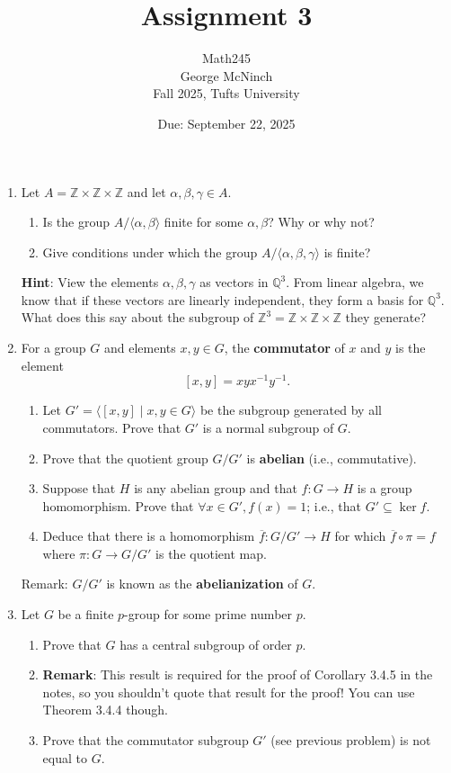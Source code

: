 \documentclass{article}
\title{Assignment 3}
\author{Math245 \\ George McNinch \\ Fall 2025, Tufts University}
\date{Due: September 22, 2025}
\begin{document}
\maketitle

\begin{enumerate}
\item Let $ A = \mathbb{Z} \times \mathbb{Z} \times \mathbb{Z} $ and let $ \alpha, \beta, \gamma \in A $.
  \begin{enumerate}
  \item Is the group $ A / \langle \alpha, \beta \rangle $ finite for some $ \alpha, \beta $? Why or why not?
  \item Give conditions under which the group $ A / \langle \alpha, \beta, \gamma \rangle $ is finite?
  \end{enumerate}
  \textbf{Hint}: View the elements $ \alpha, \beta, \gamma $ as vectors in $ \mathbb{Q}^3 $. From linear algebra, we know that if these vectors are linearly independent, they form a basis for $ \mathbb{Q}^3 $. What does this say about the subgroup of $ \mathbb{Z}^3 = \mathbb{Z} \times \mathbb{Z} \times \mathbb{Z} $ they generate?

\item For a group $ G $ and elements $ x, y \in G $, the \textbf{commutator} of $ x $ and $ y $ is the element
  $$[x,y] = x y x^{-1} y^{-1}.$$
  \begin{enumerate}
  \item Let $ G' = \langle [x,y] \mid x,y \in G \rangle $ be the subgroup generated by all commutators. Prove that $ G' $ is a normal subgroup of $ G $.
  \item Prove that the quotient group $ G / G' $ is \textbf{abelian} (i.e., commutative).
  \item Suppose that $ H $ is any abelian group and that $ f: G \to H $ is a group homomorphism. Prove that $ \forall x \in G', f(x) = 1 $; i.e., that $ G' \subseteq \ker f $.
  \item Deduce that there is a homomorphism $ \overline{f}: G / G' \to H $ for which $ \overline{f} \circ \pi = f $ where $ \pi: G \to G / G' $ is the quotient map.
  \end{enumerate}
  Remark: $ G / G' $ is known as the \textbf{abelianization} of $ G $.

\item Let $ G $ be a finite $ p $-group for some prime number $ p $.
  \begin{enumerate}
  \item Prove that $ G $ has a central subgroup of order $ p $.
  \item \textbf{Remark}: This result is required for the proof of Corollary 3.4.5 in the notes, so you shouldn't quote that result for the proof! You can use Theorem 3.4.4 though.
  \item Prove that the commutator subgroup $ G' $ (see previous problem) is not equal to $ G $.
  \end{enumerate}


\end{enumerate}
\end{document}
